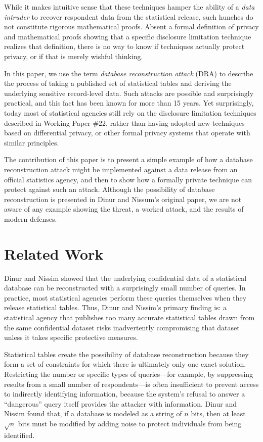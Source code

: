 \documentclass[runningheads]{llncs}
\newif\iflongversion
\newcommand{\citelong}[1]{}
\newcommand{\citelong}[1]{\cite{#1}}
\begin{document}
While it makes intuitive sense that these techniques hamper the
ability of a  \emph{data intruder}\citelong{data-intruder} to recover respondent data from the
statistical release, such hunches do not constitute rigorous
mathematical proofs. Absent a formal definition of privacy and
mathematical proofs showing that a specific disclosure limitation
technique realizes that definition, there is no way to know if
techniques actually protect privacy, or if that is merely wishful thinking.

In this paper, we use
the term \emph{database reconstruction attack} (DRA) to describe the process of
taking a published set of statistical tables and deriving the
underlying sensitive record-level data. Such attacks are possible and surprisingly
practical, and this fact has been known for more than 15
years\cite{noise}. Yet surprisingly, today most of
statistical agencies still rely on the disclosure
limitation techniques described in Working Paper \#22, rather than
having adopted new techniques based on differential
privacy\cite{Dwork:2006:CNS:2180286.2180305}, or other formal privacy systems 
that operate with similar principles\cite{KiferMachanavajjhala:2012}.

The contribution of this paper is to present a simple example of how
a database reconstruction attack might be implemented against a data
release from an official statistics agency, and then to show how a
formally private technique can protect against such an
attack. Although the possibility of database reconstruction is
presented in Dinur and Nissum's original paper\cite{noise}, we are not
aware of any \iflongversion end-to-end \fi example showing the threat, a worked attack,
and the results of modern defenses.

\section{Related Work}

Dinur and Nissim\cite{noise} showed that the underlying
confidential data of a statistical database can be reconstructed with
a surprisingly small number of queries. In practice, most statistical
agencies perform these queries themselves when they release
statistical tables. Thus, Dinur and Nissim's primary finding
is: a statistical agency that publishes too many accurate statistical
tables drawn from the same confidential dataset risks inadvertently
compromising that dataset unless it takes specific protective measures.

Statistical tables create the possibility of database reconstruction
because they form a set of constraints for which there is ultimately
only one exact solution. Restricting
the number or specific types of queries---for example, by suppressing
results from a small number of respondents---is often insufficient to prevent access
to indirectly identifying information, because the system's refusal to
answer a ``dangerous'' query itself provides the attacker with information. 
Dinur and Nissim found that, if a database is modeled as a string of $n$ bits,
then at least $\sqrt{n}$ bits must be modified by adding noise to
protect individuals from being identified.
\end{document}
